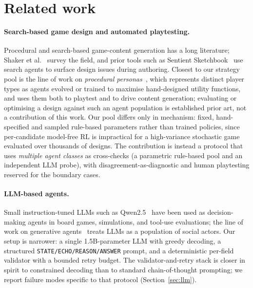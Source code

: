 \documentclass[10pt]{article}
\begin{document}
\section{Related work}\label{sec:related}

\paragraph{Search-based game design and automated playtesting.}
Procedural and search-based game-content generation has a long
literature; Shaker et al.~\cite{togelius_pcg} survey the field, and
prior tools such as Sentient Sketchbook~\cite{liapis_sentient} use
search agents to surface design issues during authoring. Closest to
our strategy pool is the line of work on \emph{procedural
personas}~\cite{holmgard_personas}, which represents distinct player
types as agents evolved or trained to maximise hand-designed utility
functions, and uses them both to playtest and to drive content
generation; evaluating or optimising a design against such an agent
population is established prior art, not a contribution of this work.
Our pool differs only in mechanism: fixed, hand-specified and sampled
rule-based parameters rather than trained policies, since
per-candidate model-free RL is impractical for a high-variance
stochastic game evaluated over thousands of designs. The contribution
is instead a protocol that uses \emph{multiple agent classes} as
cross-checks (a parametric rule-based pool and an independent LLM
probe), with disagreement-as-diagnostic and human playtesting
reserved for the boundary cases.

\paragraph{LLM-based agents.} Small instruction-tuned LLMs such as
Qwen2.5~\cite{qwen25} have been used as decision-making agents in
board games, simulations, and tool-use evaluations; the line of
work on generative agents~\cite{park_generative_agents} treats LLMs
as a population of social actors. Our setup is narrower: a single
1.5B-parameter LLM with greedy decoding, a structured
\texttt{STATE/ECHO/REASON/ANSWER} prompt, and a deterministic
per-field validator with a bounded retry budget. The
validator-and-retry stack is closer in spirit to constrained
decoding than to standard chain-of-thought prompting; we report
failure modes specific to that protocol (Section~\ref{sec:llm}).
\end{document}
